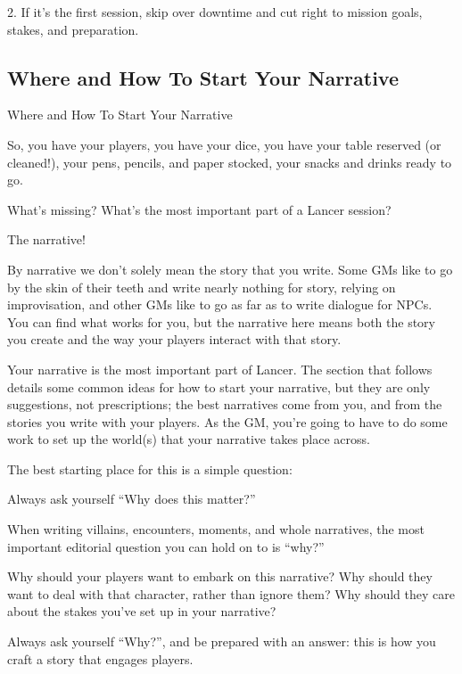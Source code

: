          	2. If it’s the first session, skip over downtime and cut right to mission goals, stakes, and  
         preparation.
 
\subsection{Where and How To Start Your Narrative}

                          Where and How To Start Your Narrative  

So, you have your players, you have your dice, you have your table reserved (or cleaned!), your  
pens, pencils, and paper stocked, your snacks and drinks ready to go.
 

What’s missing? What’s the most important part of a Lancer session?
 

The narrative! 
 

                                                                                                               


By narrative we don’t solely mean the story that you write. Some GMs like to go by the skin of  
their teeth and write nearly nothing for story, relying on improvisation, and other GMs like to go  
as far as to write dialogue for NPCs. You can find what works for you, but the narrative here  
means both the story you create and the way your players interact with that story.
 

Your narrative is the most important part of Lancer. The section that follows details some  
common ideas for how to start your narrative, but they are only suggestions, not prescriptions;  
the best narratives come from you, and from the stories you write with your players. As the GM,  
you’re going to have to do some work to set up the world(s) that your narrative takes place  
across. 
 

The best starting place for this is a simple question:
 

Always ask yourself  “Why does this matter?”   

When writing villains, encounters, moments, and whole narratives, the most important editorial  
question you can hold on to is “why?”
 

Why should your players want to embark on this narrative? Why should they want to deal with  
that character, rather than ignore them? Why should they care about the stakes you’ve set up in  
your narrative? 
 

Always ask yourself “Why?”, and be prepared with an answer: this is how you craft a story that  
engages players.
 

